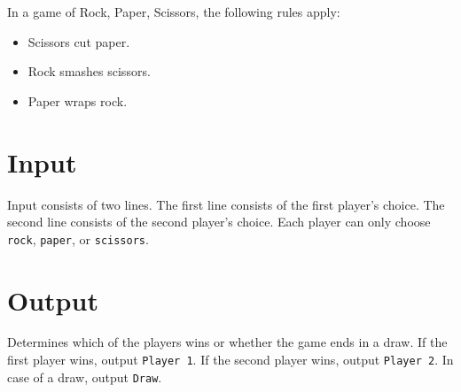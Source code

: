 
In a game of Rock, Paper, Scissors, the following rules apply:

\begin{itemize}
    \item Scissors cut paper.
    \item Rock smashes scissors.
    \item Paper wraps rock.
\end{itemize}

\section*{Input}
Input consists of two lines.
The first line consists of the first player's choice.
The second line consists of the second player's choice.
Each player can only choose \texttt{rock}, \texttt{paper}, or \texttt{scissors}.

\section*{Output}
Determines which of the players wins or whether the game ends in a draw.
If the first player wins, output \texttt{Player 1}.
If the second player wins, output \texttt{Player 2}.
In case of a draw, output \texttt{Draw}.
